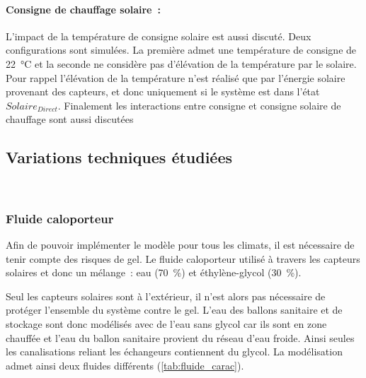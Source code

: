 \paragraph{Consigne de chauffage solaire~:} %
\label{par:consigne_de_chauffage_solaire}
L’impact de la température de consigne solaire est aussi discuté. Deux configurations sont
simulées. La première admet une température de consigne de \SI{22}{\celsius} et la seconde
ne considère pas d’élévation de la température par le solaire. Pour rappel l’élévation de
la température n’est réalisé que par l’énergie solaire provenant des capteurs, et donc
uniquement si le système est dans l’état $Solaire_{Direct}$. Finalement les interactions
entre consigne et consigne solaire de chauffage sont aussi discutées


\subsection{Variations techniques étudiées} %
\label{sub:variations_techniques_etudiees}

~
\subsubsection{Fluide caloporteur} %
\label{ssub:fluide_caloporteur}
Afin de pouvoir implémenter le modèle pour tous les climats, il est nécessaire de
tenir compte des risques de gel. Le fluide caloporteur utilisé à travers les capteurs
solaires et donc un mélange~: eau (\SI{70}{\percent}) et éthylène-glycol (\SI{30}{\percent}).

Seul les capteurs solaires sont à l’extérieur, il n’est alors pas nécessaire
de protéger l’ensemble du système contre le gel. L’eau des ballons sanitaire et de stockage
sont donc  modélisés avec de l’eau sans glycol car ils sont en zone chauffée et l’eau du ballon
sanitaire provient du réseau d’eau froide. Ainsi seules les canalisations reliant les échangeurs
contiennent du glycol. La modélisation admet ainsi deux fluides différents (\autoref{tab:fluide_carac}).

